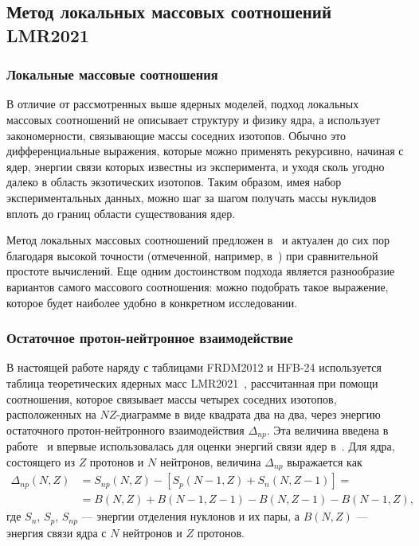\subsection{Метод локальных массовых соотношений LMR2021}
\subsubsection{Локальные массовые соотношения}
В отличие от рассмотренных выше ядерных моделей, подход локальных массовых соотношений не описывает структуру и физику ядра, а использует закономерности, связывающие массы соседних изотопов. Обычно это дифференциальные выражения, которые можно применять рекурсивно, начиная с ядер, энергии связи которых известны из эксперимента, и уходя сколь угодно далеко в область экзотических изотопов. Таким образом, имея набор экспериментальных данных, можно шаг за шагом получать массы нуклидов вплоть до границ области существования ядер.

Метод локальных массовых соотношений предложен в~\cite{garvey1966} и актуален до сих пор благодаря высокой точности (отмеченной, например, в~\cite{bao2014}) при сравнительной простоте вычислений. Еще одним достоинством подхода является разнообразие вариантов самого массового соотношения: можно подобрать такое выражение, которое будет наиболее удобно в конкретном исследовании.

\subsubsection{Остаточное протон-нейтронное взаимодействие}
В настоящей работе наряду с таблицами FRDM2012 и HFB-24 используется таблица теоретических ядерных масс LMR2021~\cite{vladimirova2022}, рассчитанная при помощи соотношения, которое связывает массы четырех соседних изотопов, расположенных на $NZ$-диаграмме в виде квадрата два на два, через энергию остаточного протон-нейтронного взаимодействия $\Delta_{np}$. Эта величина введена в работе~\cite{kravtsov1959} и впервые использовалась для оценки энергий связи ядер в~\cite{janecke1974}. Для ядра, состоящего из $Z$ протонов и $N$ нейтронов, величина $\Delta_{np}$ выражается как
\begin{equation}\label{eq:np-interaction}
  \begin{aligned}
    \Delta_{np}(N,Z) &= S_{np}(N,Z) - [S_{p}(N-1,Z) + S_{n}(N,Z-1)] = \\
    &= B(N,Z) + B(N-1,Z-1) - B(N,Z-1) - B(N-1,Z),
  \end{aligned}
\end{equation}
где $S_n$, $S_p$, $S_{np}$ --- энергии отделения нуклонов и их пары, а $B(N,Z)$ --- энергия связи ядра с $N$ нейтронов и $Z$ протонов.

